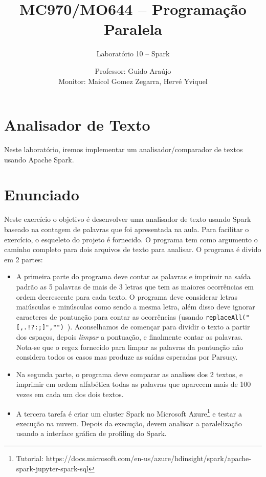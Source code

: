 \documentclass[a4paper,12pt]{scrartcl}
\begin{document}

\title{MC970/MO644 -- Programação Paralela}
\subtitle{Laboratório 10 -- Spark}
\author{Professor: Guido Araújo \\
	Monitor: Maicol Gomez Zegarra, Hervé Yviquel}
\date{}

\maketitle

\section{Analisador de Texto}

Neste laboratório, iremos implementar um analisador/comparador de textos usando Apache Spark.

\section{Enunciado}

Neste exercício o objetivo é desenvolver uma analisador de texto usando Spark baseado na contagem de palavras que foi apresentada na aula. Para facilitar o exercício, o esqueleto do projeto é fornecido. O programa tem como argumento o caminho completo para dois arquivos de texto para analisar. O programa é divido em 2 partes:
\begin{itemize}
	\item A primeira parte do programa deve contar as palavras e imprimir na saída padrão as 5 palavras de mais de 3 letras que tem as maiores ocorrências em ordem decrescente para cada texto. O programa deve considerar letras maiúsculas e minúsculas como sendo a mesma letra, além disso deve ignorar caracteres de pontuação para contar as ocorrências (usando
	 \lstinline[style=BashInputStyle]|replaceAll("[,.!?:;]","")|~). Aconselhamos de començar para dividir o texto a partir dos espaços, depois \textit{limpar} a pontuação, e finalmente contar as palavras. Nota-se que o regex fornecido para limpar as palavras da pontuação não considera todos os casos mas produze as saídas esperadas por Parsusy. 
	\item Na segunda parte, o programa deve comparar as analises dos 2 textos, e imprimir em ordem alfabética todas as palavras que aparecem mais de 100 vezes em cada um dos dois textos.
	\item A tercera tarefa é criar um cluster Spark no Microsoft Azure\footnote{Tutorial: https://docs.microsoft.com/en-us/azure/hdinsight/spark/apache-spark-jupyter-spark-sql} e testar a execução na nuvem. Depois da execução, devem analisar a paralelização usando a interface gráfica de profiling do Spark. 
\end{itemize}
\end{document}
